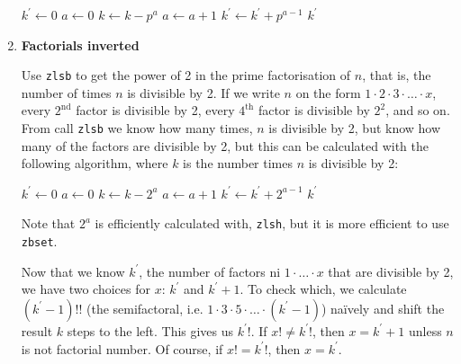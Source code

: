 \begin{enumerate}[label=\textbf{\arabic*}.]
\vspace{1em}
\hspace{-2.8ex}
\begin{minipage}{\linewidth}
\begin{algorithmic}
    \STATE $k^\prime \gets 0$
      \STATE $a \gets 0$
        \STATE $k \gets k - p^a$
        \STATE $a \gets a + 1$
      \ENDWHILE
      \STATE $k^\prime \gets k^\prime + p^{a - 1}$
    \ENDWHILE
    \RETURN $k^\prime$
\end{algorithmic}
\end{minipage}
\vspace{1em}



\item \textbf{Factorials inverted}

Use \texttt{zlsb} to get the power of 2 in the
prime factorisation of $n$, that is, the number
of times $n$ is divisible by 2. If we write $n$ on
the form $1 \cdot 2 \cdot 3 \cdot \ldots \cdot x$,
every $2^\text{nd}$ factor is divisible by 2, every
$4^\text{th}$ factor is divisible by $2^2$, and so on.
From call \texttt{zlsb} we know how many times,
$n$ is divisible by 2, but know how many of the factors
are divisible by 2, but this can be calculated with
the following algorithm, where $k$ is the number
times $n$ is divisible by 2:

\vspace{1em}
\hspace{-2.8ex}
\begin{minipage}{\linewidth}
\begin{algorithmic}
    \STATE $k^\prime \gets 0$
      \STATE $a \gets 0$
        \STATE $k \gets k - 2^a$
        \STATE $a \gets a + 1$
      \ENDWHILE
      \STATE $k^\prime \gets k^\prime + 2^{a - 1}$
    \ENDWHILE
    \RETURN $k^\prime$
\end{algorithmic}
\end{minipage}
\vspace{1em}

\noindent
Note that $2^a$ is efficiently calculated with,
\texttt{zlsh}, but it is more efficient to use
\texttt{zbset}.

Now that we know $k^\prime$, the number of
factors ni $1 \cdot \ldots \cdot x$ that are
divisible by 2, we have two choices for $x$:
$k^\prime$ and $k^\prime + 1$. To check which, we
calculate $(k^\prime - 1)!!$ (the semifactoral, i.e.
$1 \cdot 3 \cdot 5 \cdot \ldots \cdot (k^\prime - 1)$)
naïvely and shift the result $k$ steps to the left.
This gives us $k^\prime!$. If $x! \neq k^\prime!$, then
$x = k^\prime + 1$ unless $n$ is not factorial number.
Of course, if $x! = k^\prime!$, then $x = k^\prime$.




\end{enumerate}
